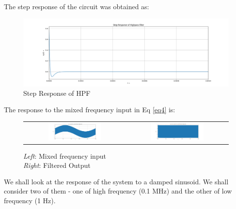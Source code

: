 \documentclass[11pt, a4paper, twoside]{article}
\begin{document}
The step response of the circuit was obtained as:

\begin{figure}[H]
    \centering
    \includegraphics[scale=0.4]{plots/Fig 10.png}
    \caption{Step Response of HPF}
    \label{fig:Fig7}
\end{figure}

The response to the mixed frequency input in Eq \eqref{eq4} is:

\begin{figure}[H]
    \centering
    \setlength\tabcolsep{1pt}
    \begin{tabular}{cc}
        \includegraphics[width=0.55\textwidth]{plots/Fig 6.png} &
        \includegraphics[width=0.55\textwidth]{plots/Fig 7.png}\\
    \end{tabular}
    \caption{\textit{Left}: Mixed frequency input\\\textit{Right}: Filtered Output}
\end{figure}
    
We shall look at the response of the system to a damped sinusoid. We shall consider two of them - one of high frequency (0.1 MHz) and the other of low frequency (1 Hz).
\end{document}
